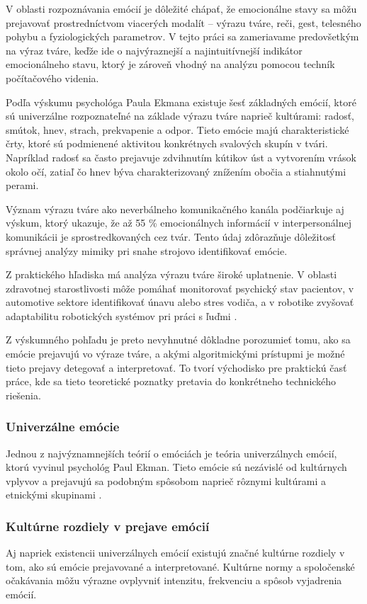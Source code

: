V oblasti rozpoznávania emócií je dôležité chápať, že emocionálne stavy sa môžu prejavovať prostredníctvom viacerých modalít – výrazu tváre, reči, gest, telesného pohybu a fyziologických parametrov. 
V tejto práci sa zameriavame predovšetkým na výraz tváre, keďže ide o najvýraznejší a najintuitívnejší 
indikátor emocionálneho stavu, ktorý je zároveň vhodný na analýzu pomocou techník počítačového videnia.

Podľa výskumu psychológa Paula Ekmana existuje šesť základných emócií, ktoré sú univerzálne rozpoznateľné na základe výrazu tváre naprieč kultúrami: radosť, smútok, hnev, strach, prekvapenie a odpor. 
Tieto emócie majú charakteristické črty, ktoré sú podmienené aktivitou konkrétnych svalových skupín v tvári. 
Napríklad radosť sa často prejavuje zdvihnutím kútikov úst a vytvorením vrások okolo očí, zatiaľ čo hnev býva charakterizovaný znížením obočia a stiahnutými perami.

Význam výrazu tváre ako neverbálneho komunikačného kanála podčiarkuje aj výskum, ktorý ukazuje, že až 55 \% emocionálnych informácií v interpersonálnej komunikácii je sprostredkovaných cez tvár. 
Tento údaj zdôrazňuje dôležitosť správnej analýzy mimiky pri snahe strojovo identifikovať emócie.

Z praktického hľadiska má analýza výrazu tváre široké uplatnenie. V oblasti zdravotnej starostlivosti môže pomáhať monitorovať psychický stav pacientov, v automotive sektore identifikovať únavu alebo stres vodiča, 
a v robotike zvyšovať adaptabilitu robotických systémov pri práci s ľuďmi .

Z výskumného pohľadu je preto nevyhnutné dôkladne porozumieť tomu, ako sa emócie prejavujú vo výraze tváre, a akými algoritmickými prístupmi je možné tieto prejavy detegovať a interpretovať. To tvorí východisko pre praktickú časť práce, 
kde sa tieto teoretické poznatky pretavia do konkrétneho technického riešenia.
\subsubsection{Univerzálne emócie}
Jednou z najvýznamnejších teórií o emóciách je teória univerzálnych emócií, ktorú vyvinul psychológ Paul Ekman. 
Tieto emócie sú nezávislé od kultúrnych vplyvov a prejavujú sa podobným spôsobom naprieč rôznymi kultúrami a etnickými skupinami \cite{article03}.
\subsubsection{Kultúrne rozdiely v prejave emócií}
Aj napriek existencii univerzálnych emócií existujú značné kultúrne rozdiely v tom, ako sú emócie prejavované a interpretované. Kultúrne normy a spoločenské očakávania môžu výrazne ovplyvniť intenzitu, frekvenciu a spôsob vyjadrenia emócií.

